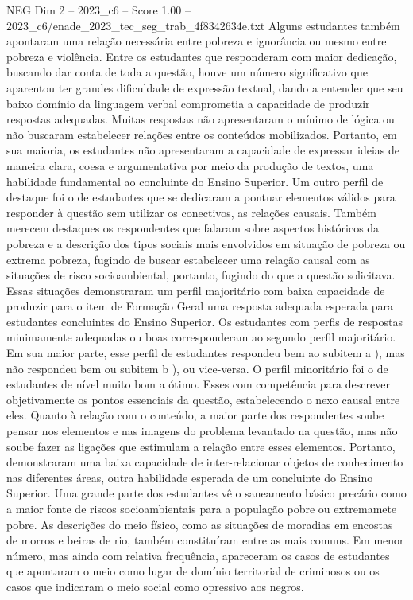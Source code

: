 \begin{textsample}{NEG Dim 2 – 2023\_c6 – Score 1.00 – 2023\_c6/enade\_2023\_tec\_seg\_trab\_4f8342634e.txt}
Alguns estudantes também apontaram uma relação necessária entre pobreza e ignorância ou mesmo entre pobreza e violência.
Entre os estudantes que responderam com maior dedicação, buscando dar conta de toda a questão, houve um número significativo que aparentou ter grandes dificuldade de expressão textual, dando a entender que seu baixo domínio da linguagem verbal comprometia a capacidade de produzir respostas adequadas.
Muitas respostas não apresentaram o mínimo de lógica ou não buscaram estabelecer relações entre os conteúdos mobilizados.
Portanto, em sua maioria, os estudantes não apresentaram a capacidade de expressar ideias de maneira clara, coesa e argumentativa por meio da produção de textos, uma habilidade fundamental ao concluinte do Ensino Superior.
Um outro perfil de destaque foi o de estudantes que se dedicaram a pontuar elementos válidos para responder à questão sem utilizar os conectivos, as relações causais.
Também merecem destaques os respondentes que falaram sobre aspectos históricos da pobreza e a descrição dos tipos sociais mais envolvidos em situação de pobreza ou extrema pobreza, fugindo de buscar estabelecer uma relação causal com as situações de risco socioambiental, portanto, fugindo do que a questão solicitava.
Essas situações demonstraram um perfil majoritário com baixa capacidade de produzir para o item de Formação Geral uma resposta adequada esperada para estudantes concluintes do Ensino Superior.
Os estudantes com perfis de respostas minimamente adequadas ou boas corresponderam ao segundo perfil majoritário.
Em sua maior parte, esse perfil de estudantes respondeu bem ao subitem a ), mas não respondeu bem ou subitem b ), ou vice-versa.
O perfil minoritário foi o de estudantes de nível muito bom a ótimo.
Esses com competência para descrever objetivamente os pontos essenciais da questão, estabelecendo o nexo causal entre eles.
Quanto à relação com o conteúdo, a maior parte dos respondentes soube pensar nos elementos e nas imagens do problema levantado na questão, mas não soube fazer as ligações que estimulam a relação entre esses elementos.
Portanto, demonstraram uma baixa capacidade de inter-relacionar objetos de conhecimento nas diferentes áreas, outra habilidade esperada de um concluinte do Ensino Superior.
Uma grande parte dos estudantes vê o saneamento básico precário como a maior fonte de riscos socioambientais para a população pobre ou extremamete pobre.
As descrições do meio físico, como as situações de moradias em encostas de morros e beiras de rio, também constituíram entre as mais comuns.
Em menor número, mas ainda com relativa frequência, apareceram os casos de estudantes que apontaram o meio como lugar de domínio territorial de criminosos ou os casos que indicaram o meio social como opressivo aos negros.

\end{textsample}
